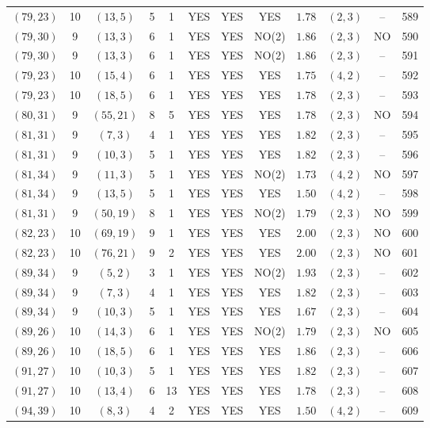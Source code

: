 \begin{longtable}{|c|c|c|c|c|c|c|c|c|c|c|c|}
$(79,23)$ & 10 & $(13,5)$ & 5 & 1 & YES & YES & YES & $1.78$ & $(2,3)$ & -- & 589\\
$(79,30)$ & 9 & $(13,3)$ & 6 & 1 & YES & YES & NO(2) & $1.86$ & $(2,3)$ & NO & 590\\
$(79,30)$ & 9 & $(13,3)$ & 6 & 1 & YES & YES & NO(2) & $1.86$ & $(2,3)$ & -- & 591\\
$(79,23)$ & 10 & $(15,4)$ & 6 & 1 & YES & YES & YES & $1.75$ & $(4,2)$ & -- & 592\\
$(79,23)$ & 10 & $(18,5)$ & 6 & 1 & YES & YES & YES & $1.78$ & $(2,3)$ & -- & 593\\
$(80,31)$ & 9 & $(55,21)$ & 8 & 5 & YES & YES & YES & $1.78$ & $(2,3)$ & NO & 594\\
$(81,31)$ & 9 & $(7,3)$ & 4 & 1 & YES & YES & YES & $1.82$ & $(2,3)$ & -- & 595\\
$(81,31)$ & 9 & $(10,3)$ & 5 & 1 & YES & YES & YES & $1.82$ & $(2,3)$ & -- & 596\\
$(81,34)$ & 9 & $(11,3)$ & 5 & 1 & YES & YES & NO(2) & $1.73$ & $(4,2)$ & NO & 597\\
$(81,34)$ & 9 & $(13,5)$ & 5 & 1 & YES & YES & YES & $1.50$ & $(4,2)$ & -- & 598\\
$(81,31)$ & 9 & $(50,19)$ & 8 & 1 & YES & YES & NO(2) & $1.79$ & $(2,3)$ & NO & 599\\
$(82,23)$ & 10 & $(69,19)$ & 9 & 1 & YES & YES & YES & $2.00$ & $(2,3)$ & NO & 600\\
$(82,23)$ & 10 & $(76,21)$ & 9 & 2 & YES & YES & YES & $2.00$ & $(2,3)$ & NO & 601\\
$(89,34)$ & 9 & $(5,2)$ & 3 & 1 & YES & YES & NO(2) & $1.93$ & $(2,3)$ & -- & 602\\
$(89,34)$ & 9 & $(7,3)$ & 4 & 1 & YES & YES & YES & $1.82$ & $(2,3)$ & -- & 603\\
$(89,34)$ & 9 & $(10,3)$ & 5 & 1 & YES & YES & YES & $1.67$ & $(2,3)$ & -- & 604\\
$(89,26)$ & 10 & $(14,3)$ & 6 & 1 & YES & YES & NO(2) & $1.79$ & $(2,3)$ & NO & 605\\
$(89,26)$ & 10 & $(18,5)$ & 6 & 1 & YES & YES & YES & $1.86$ & $(2,3)$ & -- & 606\\
$(91,27)$ & 10 & $(10,3)$ & 5 & 1 & YES & YES & YES & $1.82$ & $(2,3)$ & -- & 607\\
$(91,27)$ & 10 & $(13,4)$ & 6 & 13 & YES & YES & YES & $1.78$ & $(2,3)$ & -- & 608\\
$(94,39)$ & 10 & $(8,3)$ & 4 & 2 & YES & YES & YES & $1.50$ & $(4,2)$ & -- & 609\\

\end{longtable}
